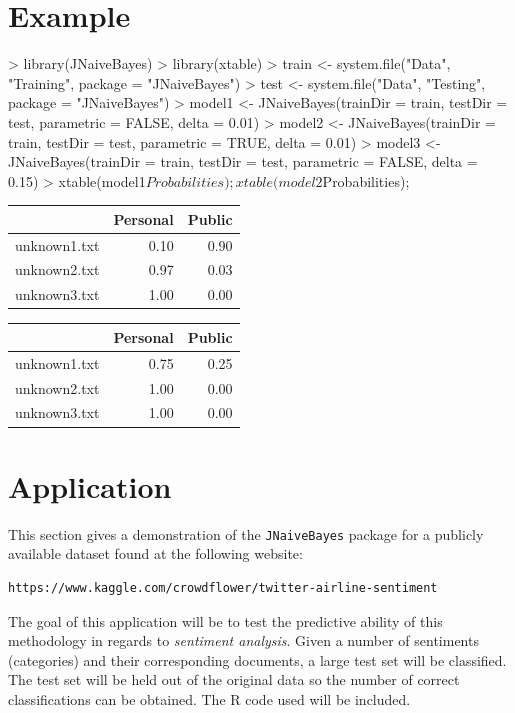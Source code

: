 \documentclass[a4paper]{article}
\begin{document}
\section{Example}
\begin{Schunk}
\begin{Sinput}
> library(JNaiveBayes)
> library(xtable)
> train <- system.file("Data", "Training", package = "JNaiveBayes")
> test <- system.file("Data", "Testing", package = "JNaiveBayes")
> model1 <- JNaiveBayes(trainDir = train, testDir = test, parametric = FALSE, delta = 0.01)
> model2 <- JNaiveBayes(trainDir = train, testDir = test, parametric = TRUE, delta = 0.01)
> model3 <- JNaiveBayes(trainDir = train, testDir = test, parametric = FALSE, delta = 0.15)
> xtable(model1$Probabilities);xtable(model2$Probabilities);
\end{Sinput}
\begin{table}[ht]
\centering
\begin{tabular}{rrr}
  \hline
 & Personal & Public \\ 
  \hline
unknown1.txt & 0.10 & 0.90 \\ 
  unknown2.txt & 0.97 & 0.03 \\ 
  unknown3.txt & 1.00 & 0.00 \\ 
   \hline
\end{tabular}
\end{table}%
\begin{table}[ht]
\centering
\begin{tabular}{rrr}
  \hline
 & Personal & Public \\ 
  \hline
unknown1.txt & 0.75 & 0.25 \\ 
  unknown2.txt & 1.00 & 0.00 \\ 
  unknown3.txt & 1.00 & 0.00 \\ 
   \hline
\end{tabular}
\end{table}\end{Schunk}

\section{Application}
This section gives a demonstration of the {\tt JNaiveBayes} package for a publicly available dataset found at the following website:
\begin{center}
{\footnotesize{
\begin{verbatim}
https://www.kaggle.com/crowdflower/twitter-airline-sentiment
\end{verbatim}}}
\end{center}
The goal of this application will be to test the predictive ability of this methodology in regards to {\it sentiment analysis}. Given a number of sentiments (categories) and their corresponding documents, a large test set will be classified. The test set will be held out of the original data so the number of correct classifications can be obtained. The R code used will be included.
\end{document}
